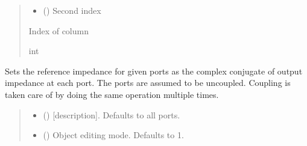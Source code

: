 \documentclass[letterpaper,10pt,english]{sphinxmanual}
\begin{document}
\begin{fulllineitems}
\begin{fulllineitems}
\begin{quote}
\begin{description}
\begin{itemize}
\item {} 
\sphinxAtStartPar
{} () \textendash{} Second index

\end{itemize}

\sphinxAtStartPar
Index of column

\sphinxAtStartPar
int

\end{description}\end{quote}

\end{fulllineitems}


\begin{fulllineitems}
\label{\detokenize{touchstone:touchstone.spfile.conj_match_uncoupled}}
\pysigstartsignatures
{}
\pysigstopsignatures
\sphinxAtStartPar
Sets the reference impedance for given ports as the complex conjugate of output impedance at each port.
The ports are assumed to be uncoupled. Coupling is taken care of by doing the same operation multiple times.
\begin{quote}\begin{description}
\begin{itemize}
\item {} 
\sphinxAtStartPar
{} (\sphinxstyleliteralemphasis{\sphinxupquote{,}}) \textendash{} {[}description{]}. Defaults to all ports.

\item {} 
\sphinxAtStartPar
{} (\sphinxstyleliteralemphasis{\sphinxupquote{, }}) \textendash{} Object editing mode. Defaults to \sphinxhyphen{}1.


\end{itemize}
\end{description}
\end{quote}
\end{fulllineitems}
\end{fulllineitems}
\end{document}
